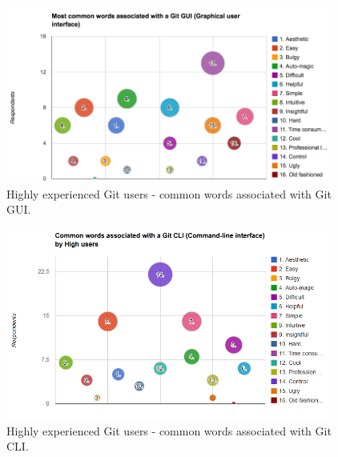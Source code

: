 \documentclass[a4paper,oneside]{bth} %
\begin{document}
				\begin{figure}[H]
					\centering
					\includegraphics[width=0.95\textwidth]{graphs/common-words-high-users-gui.png}
					\caption{Highly experienced Git users - common words associated with Git GUI.}
					\label{fig:High users - common words associated with Git GUI.}
				\end{figure}
				\begin{figure}[H]
					\centering
					\includegraphics[width=0.95\textwidth]{graphs/common-words-high-users-cli.png}
					\caption{Highly experienced Git users - common words associated with Git CLI.}
					\label{fig:High users - common words associated with Git CLI.}
				\end{figure}
				
\end{document}
